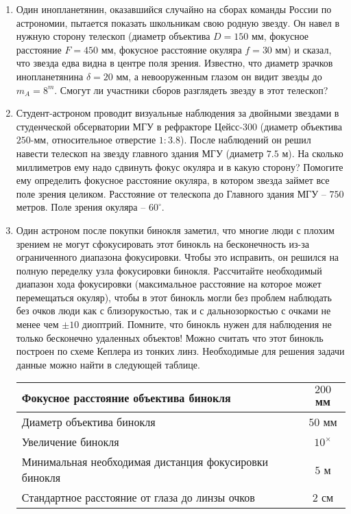 \documentclass[12pt]{article}
\begin{document}
\begin{enumerate}
    \item Один инопланетянин, оказавшийся случайно на сборах команды России по астрономии, пытается показать школьникам свою родную звезду. Он навел в нужную сторону телескоп (диаметр объектива $D = 150$ мм, фокусное расстояние $F = 450$ мм, фокусное расстояние окуляра $f = 30$ мм) и сказал, что звезда едва видна в центре поля зрения. Известно, что диаметр зрачков инопланетянина $\delta = 20$ мм, а невооруженным глазом он видит звезды до $m_A = 8^m$. Смогут ли участники сборов разглядеть звезду в этот телескоп?
    \item Студент-астроном проводит визуальные наблюдения за двойными звездами в студенческой обсерватории МГУ в рефракторе Цейсс-300 (диаметр объектива $250$-мм, относительное отверстие $1:3.8$). После наблюдений он решил навести телескоп на звезду главного здания МГУ (диаметр $7.5$ м). На сколько миллиметров ему надо сдвинуть фокус окуляра и в какую сторону? Помогите ему определить фокусное расстояние окуляра, в котором звезда займет все поле зрения целиком. Расстояние от телескопа до Главного здания МГУ -- $750$ метров. Поле зрения окуляра -- $60^{\circ}$.
    \item Один астроном после покупки бинокля заметил, что многие люди с плохим зрением не могут сфокусировать этот бинокль на бесконечность из-за ограниченного диапазона фокусировки. Чтобы это исправить, он решился на полную переделку узла фокусировки бинокля. Рассчитайте необходимый диапазон хода фокусировки (максимальное расстояние на которое может перемещаться окуляр), чтобы в этот бинокль могли без проблем наблюдать без очков люди как с близорукостью, так и с дальнозоркостью с очками не менее чем $\pm10$ диоптрий. Помните, что бинокль нужен для наблюдения не только бесконечно удаленных объектов! Можно считать что этот бинокль построен по схеме Кеплера из тонких линз. Необходимые для решения задачи данные можно найти в следующей таблице.
    \begin{table}[h]
        \centering
        \begin{tabular}{|l|c|}\hline
            Фокусное расстояние объектива бинокля & $200$ мм \\ \hline
            Диаметр объектива бинокля & $50$ мм \\ \hline
            Увеличение бинокля & $10^{\times}$ \\ \hline
            Минимальная необходимая дистанция фокусировки бинокля & $5$ м \\ \hline 
            Стандартное расстояние от глаза до линзы очков & $2$ см \\ \hline

\end{tabular}
\end{table}
\end{enumerate}
\end{document}
